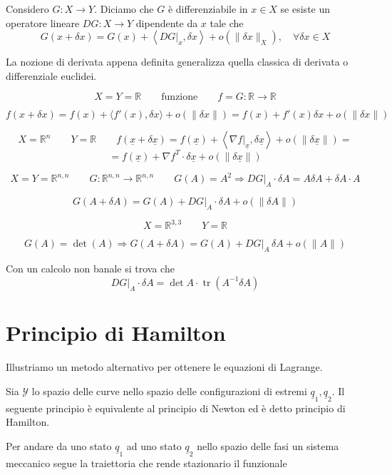 \begin{definition}{}
Considero \(G:X\to Y\). Diciamo che \(G\) è differenziabile in \(x\in X\) se esiste un operatore lineare \(DG:X\to Y\) dipendente da \(x\) tale che
\[
G(x+\delta x)=G(x)+\left\langle DG\big|_x,\delta x\right\rangle+o(\|\delta x\|_X), \quad \forall \delta x \in X
\]
\end{definition}
La nozione di derivata appena definita generalizza quella classica di derivata o differenziale euclidei.
\begin{example}{}
\[
X=Y=\mathbb{R}
\qquad
\text{funzione}
\qquad
f=G:\mathbb{R}\to\mathbb{R}
\]

\[
f(x+\delta x)
=
f(x)+\langle f'(x),\delta x\rangle+o(\|\delta x\|)
=
f(x)+f'(x)\delta x+o(\|\delta x\|)
\]

\[
X=\mathbb{R}^n
\qquad
Y=\mathbb{R}
\qquad
f(\underline{x}+\delta\underline{x})
=
f(\underline{x})
+
\left\langle \nabla f\big|_{\underline{x}},\delta\underline{x}\right\rangle
+
o(\|\delta\underline{x}\|)
=
\]
\[
=
f(\underline{x})
+
\nabla f^T\cdot \delta\underline{x}
+
o(\|\delta\underline{x}\|)
\]

\[
X=Y=\mathbb{R}^{n,n}
\qquad
G:\mathbb{R}^{n,n}\to\mathbb{R}^{n,n}
\qquad
G(A)=A^2
\Rightarrow
DG\big|_A\cdot \delta A
=
A\delta A+\delta A\cdot A
\]

\[
G(A+\delta A)
=
G(A)
+
DG\big|_A\cdot \delta A
+
o(\|\delta A\|)
\]
\end{example}
\begin{example}{}
\[
X=\mathbb{R}^{3,3}
\qquad
Y=\mathbb{R}
\]

\[
G(A)=\det(A)
\Rightarrow
G(A+\delta A)
=
G(A)
+
DG\big|_A\,\delta A
+
o(\|A\|)
\]

Con un calcolo non banale si trova che
\[
DG\big|_A\cdot \delta A
=
\det A\cdot \operatorname{tr}\left(A^{-1}\delta A\right)
\]
\end{example}

\section{Principio di Hamilton}

Illustriamo un metodo alternativo per ottenere le equazioni di Lagrange.

Sia \(\mathcal{Y}\) lo spazio delle curve nello spazio delle configurazioni di estremi \(\underline{q}_1,\underline{q}_2\). Il seguente principio è equivalente al principio di Newton ed è detto principio di Hamilton.

Per andare da uno stato \(\underline{q}_1\) ad uno stato \(\underline{q}_2\) nello spazio delle fasi un sistema meccanico segue la traiettoria che rende stazionario il funzionale

